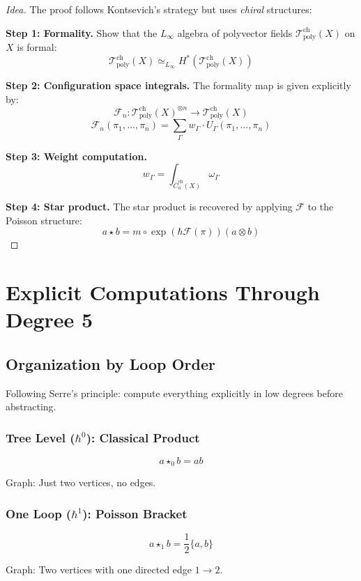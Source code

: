 \begin{proof}[Idea]
The proof follows Kontsevich's strategy but uses \emph{chiral} structures:

\textbf{Step 1: Formality.}
Show that the $L_\infty$ algebra of polyvector fields $\mathcal{T}_{\text{poly}}^{\text{ch}}(X)$ on $X$ is formal:
$$\mathcal{T}_{\text{poly}}^{\text{ch}}(X) \simeq_{L_\infty} H^*(\mathcal{T}_{\text{poly}}^{\text{ch}}(X))$$

\textbf{Step 2: Configuration space integrals.}
The formality map is given explicitly by:
$$\mathcal{F}_n: \mathcal{T}_{\text{poly}}^{\text{ch}}(X)^{\otimes n} \to \mathcal{T}_{\text{poly}}^{\text{ch}}(X)$$
$$\mathcal{F}_n(\pi_1, \ldots, \pi_n) = \sum_{\Gamma} w_\Gamma \cdot U_\Gamma(\pi_1, \ldots, \pi_n)$$

\textbf{Step 3: Weight computation.}
$$w_\Gamma = \int_{\overline{C}_n^{\text{ch}}(X)} \omega_\Gamma$$

\textbf{Step 4: Star product.}
The star product is recovered by applying $\mathcal{F}$ to the Poisson structure:
$$a \star b = m \circ \exp(\hbar \mathcal{F}(\pi))(a \otimes b)$$
\end{proof}

\section{Explicit Computations Through Degree 5}

\subsection{Organization by Loop Order}

Following Serre's principle: compute everything explicitly in low degrees before abstracting.

\subsubsection{Tree Level ($\hbar^0$): Classical Product}

$$a \star_0 b = ab$$

Graph: Just two vertices, no edges.

\subsubsection{One Loop ($\hbar^1$): Poisson Bracket}

$$a \star_1 b = \frac{1}{2}\{a, b\}$$

Graph: Two vertices with one directed edge $1 \to 2$.

